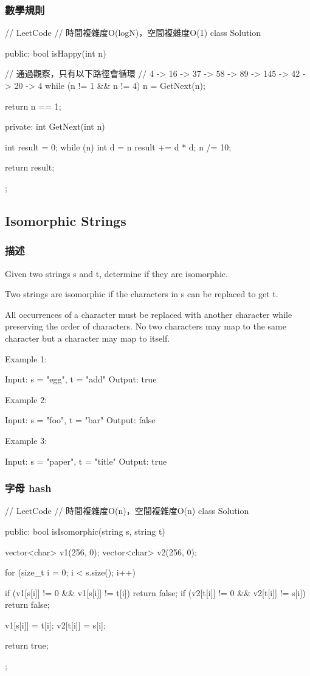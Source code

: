\subsubsection{數學規則}
\begin{Code}
// LeetCode
// 時間複雜度O(logN)，空間複雜度O(1)
class Solution {
public:
    bool isHappy(int n) {
        // 通過觀察，只有以下路徑會循環
        // 4 -> 16 -> 37 -> 58 -> 89 -> 145 -> 42 -> 20 -> 4
        while (n != 1 && n != 4)
            n = GetNext(n);

        return n == 1;
    }
private:
    int GetNext(int n)
    {
        int result = 0;
        while (n)
        {
            int d = n %
            result += d * d;
            n /= 10;
        }

        return result;
    }
};
\end{Code}

\subsection{Isomorphic Strings}
\label{sec:isomorphic-strings}

\subsubsection{描述}
Given two strings s and t, determine if they are isomorphic.

Two strings are isomorphic if the characters in s can be replaced to get t.

All occurrences of a character must be replaced with another character while preserving the order of characters. No two characters may map to the same character but a character may map to itself.

Example 1:
\begin{Code}
Input: s = "egg", t = "add"
Output: true
\end{Code}

Example 2:
\begin{Code}
Input: s = "foo", t = "bar"
Output: false
\end{Code}

Example 3:
\begin{Code}
Input: s = "paper", t = "title"
Output: true
\end{Code}

\subsubsection{字母 hash}
\begin{Code}
// LeetCode
// 時間複雜度O(n)，空間複雜度O(n)
class Solution {
public:
    bool isIsomorphic(string s, string t) {
        vector<char> v1(256, 0);
        vector<char> v2(256, 0);

        for (size_t i = 0; i < s.size(); i++)
        {
            if (v1[s[i]] != 0 && v1[s[i]] != t[i]) return false;
            if (v2[t[i]] != 0 && v2[t[i]] != s[i]) return false;

            v1[s[i]] = t[i];
            v2[t[i]] = s[i];
        }

        return true;
    }
};
\end{Code}

